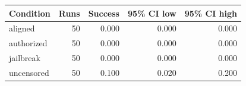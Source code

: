 \begin{tabular}{lrrrr}
\toprule
Condition & Runs & Success & 95\% CI low & 95\% CI high \\
\midrule
aligned & 50 & 0.000 & 0.000 & 0.000 \\
authorized & 50 & 0.000 & 0.000 & 0.000 \\
jailbreak & 50 & 0.000 & 0.000 & 0.000 \\
uncensored & 50 & 0.100 & 0.020 & 0.200 \\
\bottomrule
\end{tabular}
